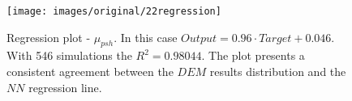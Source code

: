 \begin{figure}[!h] 
\centering 
\texttt{[image: images/original/22regression]}
\caption[Regression plot]{Regression plot - $\mu_{psh}$. In this case $Output
= 0.96 \cdot Target + 0.046$. With 546 simulations the $R^2 = 0.98044$. The plot
presents a consistent agreement between the $DEM$ results distribution and the $NN$ regression line.}
\label{fig:22regression} 
\end{figure}


